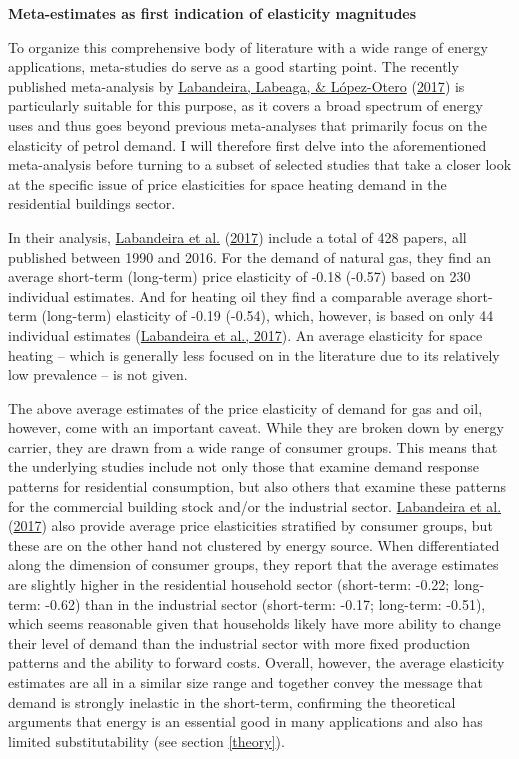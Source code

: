 \documentclass[12pt,twoside]{reedthesis}
\begin{document}
\textbf{Meta-estimates as first indication of elasticity magnitudes}

To organize this comprehensive body of literature with a wide range of energy applications, meta-studies do serve as a good starting point. The recently published meta-analysis by \protect\hyperlink{ref-labandeira_etal17}{Labandeira, Labeaga, \& López-Otero} (\protect\hyperlink{ref-labandeira_etal17}{2017}) is particularly suitable for this purpose, as it covers a broad spectrum of energy uses and thus goes beyond previous meta-analyses that primarily focus on the elasticity of petrol demand. I will therefore first delve into the aforementioned meta-analysis before turning to a subset of selected studies that take a closer look at the specific issue of price elasticities for space heating demand in the residential buildings sector.

In their analysis, \protect\hyperlink{ref-labandeira_etal17}{Labandeira et al.} (\protect\hyperlink{ref-labandeira_etal17}{2017}) include a total of 428 papers, all published between 1990 and 2016. For the demand of natural gas, they find an average short-term (long-term) price elasticity of -0.18 (-0.57) based on 230 individual estimates. And for heating oil they find a comparable average short-term (long-term) elasticity of -0.19 (-0.54), which, however, is based on only 44 individual estimates (\protect\hyperlink{ref-labandeira_etal17}{Labandeira et al., 2017}). An average elasticity for space heating -- which is generally less focused on in the literature due to its relatively low prevalence -- is not given.

The above average estimates of the price elasticity of demand for gas and oil, however, come with an important caveat. While they are broken down by energy carrier, they are drawn from a wide range of consumer groups. This means that the underlying studies include not only those that examine demand response patterns for residential consumption, but also others that examine these patterns for the commercial building stock and/or the industrial sector. \protect\hyperlink{ref-labandeira_etal17}{Labandeira et al.} (\protect\hyperlink{ref-labandeira_etal17}{2017}) also provide average price elasticities stratified by consumer groups, but these are on the other hand not clustered by energy source. When differentiated along the dimension of consumer groups, they report that the average estimates are slightly higher in the residential household sector (short-term: -0.22; long-term: -0.62) than in the industrial sector (short-term: -0.17; long-term: -0.51), which seems reasonable given that households likely have more ability to change their level of demand than the industrial sector with more fixed production patterns and the ability to forward costs. Overall, however, the average elasticity estimates are all in a similar size range and together convey the message that demand is strongly inelastic in the short-term, confirming the theoretical arguments that energy is an essential good in many applications and also has limited substitutability (see section \ref{theory}).
\end{document}

